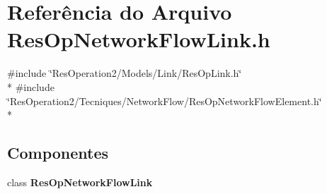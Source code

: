 \section{Referência do Arquivo Res\+Op\+Network\+Flow\+Link.\+h}
\label{_res_op_network_flow_link_8h}
{\ttfamily \#include \char`\"{}Res\+Operation2/\+Models/\+Link/\+Res\+Op\+Link.\+h\char`\"{}}\\*
{\ttfamily \#include \char`\"{}Res\+Operation2/\+Tecniques/\+Network\+Flow/\+Res\+Op\+Network\+Flow\+Element.\+h\char`\"{}}\\*
\subsection*{Componentes}
\begin{DoxyCompactItemize}
\item 
class {\bf Res\+Op\+Network\+Flow\+Link}
\end{DoxyCompactItemize}
